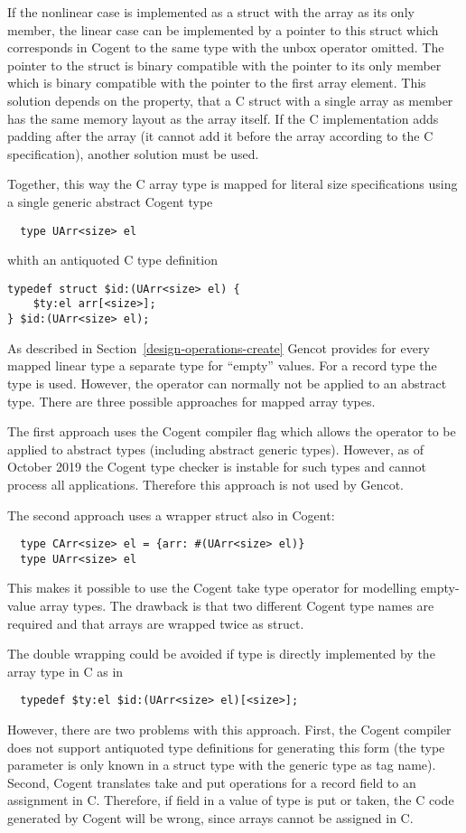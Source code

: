 If the nonlinear case is implemented as a struct with the array as its only member, the
linear case can be implemented by a pointer to this struct which corresponds in Cogent to the same type
with the unbox operator omitted. The pointer to the struct is binary compatible with the pointer to its
only member which is binary compatible with the pointer to the first array element. 
This solution depends on the property, that a C struct with a single array as member has the same memory
layout as the array itself. If the C implementation adds padding after the array (it
cannot add it before the array according to the C specification), another solution must be used.

Together, this way the C array type is mapped for literal size specifications using a single generic abstract Cogent type
\begin{verbatim}
  type UArr<size> el
\end{verbatim}
whith an antiquoted C type definition 
\begin{verbatim}
typedef struct $id:(UArr<size> el) {
	$ty:el arr[<size>];
} $id:(UArr<size> el);
\end{verbatim}

As described in Section~\ref{design-operations-create} Gencot provides for every mapped linear type a separate type
for ``empty'' values. For a record type  the type  is used. However, the 
 operator can normally not be applied to an abstract type. There are three possible approaches for mapped 
array types.

The first approach uses the Cogent compiler flag  which allows the  operator to
be applied to abstract types (including abstract generic types). However, as of October 2019 the Cogent type checker 
is instable for such types and cannot process all applications. Therefore this approach is not used by Gencot.

The second approach uses a wrapper struct also in Cogent:
\begin{verbatim}
  type CArr<size> el = {arr: #(UArr<size> el)}
  type UArr<size> el
\end{verbatim}
This makes it possible to use the Cogent take type operator for modelling empty-value array types.
The drawback is that two different Cogent type names are required and that arrays are wrapped twice as struct.

The double wrapping could be avoided if type  is directly implemented by the array type
in C as in
\begin{verbatim}
  typedef $ty:el $id:(UArr<size> el)[<size>];
\end{verbatim}
However, there are two problems with this approach. First, the Cogent compiler does not support antiquoted
type definitions for generating this form (the type parameter  is only known in a struct type
with the generic type as tag name). Second, Cogent translates take and put operations for a record field 
to an assignment in C. Therefore, if field  in a value of type  is put or taken, 
the C code generated by Cogent will be wrong, since arrays cannot be assigned in C. 

